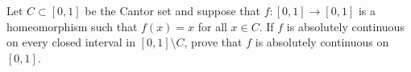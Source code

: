 Let $C\subset [0,1]$ be the Cantor set and suppose that
$f:[0,1]\rightarrow [0,1]$ is a homeomorphism such that $f(x)=x$ for
all $x\in C$. If $f$ is absolutely continuous on every closed interval
in $[0,1]\setminus C$, prove that $f$ is absolutely continuous on
$[0,1]$.
